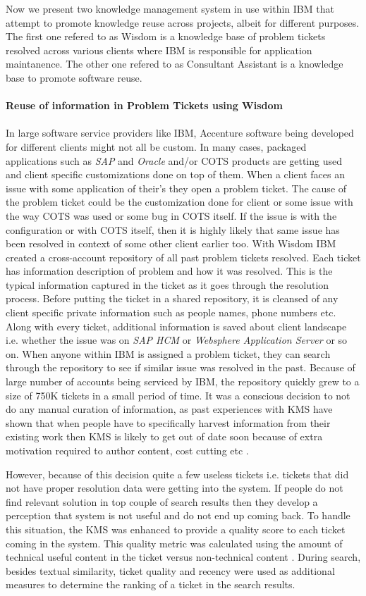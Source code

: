 Now we present two knowledge management system in use within IBM that attempt to promote knowledge reuse across projects, albeit for different purposes. The first one refered to as Wisdom\cite{} is a knowledge base of problem tickets resolved across various clients where IBM is responsible for application maintanence. The other one refered to as Consultant Assistant\cite{} is a knowledge base to promote software reuse. \\
\\
{\bf Reuse of information in Problem Tickets using Wisdom}\\ 
\\
In large software service providers like IBM, Accenture software being developed for different clients might not all be custom. In many cases, packaged applications such as \textit{SAP} and \textit{Oracle} and/or COTS products are getting used and client specific customizations done on top of them. When a client faces an issue with some application of their's they open a problem ticket. The cause of the problem ticket could be the customization done for client or some issue with the way COTS was used or some bug in COTS itself. If the issue is with the configuration or with COTS itself, then it is highly likely that same issue has been resolved in context of some other client earlier too. With Wisdom IBM created a cross-account repository of all past problem tickets resolved. Each ticket has information description of problem and how it was resolved. This is the typical information captured in the ticket as it goes through the resolution process. Before putting the ticket in a shared repository, it is cleansed of any client specific private information such as people names, phone numbers etc. Along with every ticket, additional information is saved about client landscape i.e. whether the issue was on \textit{SAP HCM} or \textit{Websphere Application Server} or so on. When anyone within IBM is assigned a problem ticket, they can search through the repository to see if similar issue was resolved in the past. Because of large number of accounts being serviced by IBM, the repository quickly grew to a size of 750K tickets in a small period of time. It was a conscious decision to not do any manual curation of information, as past experiences with KMS have shown that when people have to specifically harvest information from their existing work then KMS is likely to get out of date soon because of extra motivation required to author content, cost cutting etc \cite{}. 

However, because of this decision quite a few useless tickets i.e. tickets that did not have proper resolution data were getting into the system. If people do not find relevant solution in top couple of search results then they develop a perception that system is not useful and do not end up coming back. To handle this situation, the KMS was enhanced to provide a quality score to each ticket coming in the system. This quality metric was calculated using the amount of technical useful content in the ticket versus non-technical content \cite{}. During search, besides textual similarity, ticket quality and recency were used as additional measures to determine the ranking of a ticket in the search results. 

